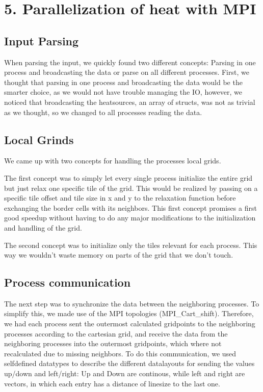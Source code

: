 \section*{5. Parallelization of heat with MPI}

\subsection*{Input Parsing}

When parsing the input, we quickly found two different concepts: Parsing in one process and broadcasting the data or parse on all different processes.
First, we thought that parsing in one process and broadcasting the data would be the smarter choice, as we would not have trouble managing the IO, however, we noticed that broadcasting the heatsources, an array of structs, was not as trivial as we thought, so we changed to all processes reading the data.

\subsection*{Local Grinds}

We came up with two concepts for handling the processes local grids. 

The first concept was to simply let every single process initialize the entire grid but just relax one specific tile of the grid. This would be realized by passing on a specific tile offset and tile size in x and y to the relaxation function before exchanging the border cells with its neighbors. This first concept promises a first good speedup without having to do any major modifications to the initialization and handling of the grid.

The second concept was to initialize only the tiles relevant for each process. This way we wouldn't waste memory on parts of the grid that we don't touch.

\subsection*{Process communication}

The next step was to synchronize the data between the neighboring processes. To simplify this, we made use of the MPI topologies (MPI\_Cart\_shift). Therefore, we had each process sent the outermost calculated gridpoints to the neighboring processes according to the cartesian grid, and receive the data from the neighboring processes into the outermost gridpoints, which where not recalculated due to missing neighbors. To do this communication, we used selfdefined datatypes to describe the different datalayouts for sending the values up/down and left/right: Up and Down are continous, while left and right are vectors, in which each entry has a distance of linesize to the last one.

